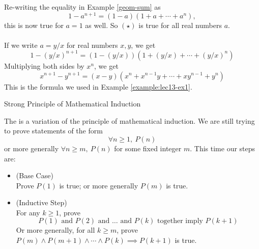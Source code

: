 \begin{remark}
Re-writing the equality in Example \ref{geom-sum} as
\[1 - a^{n+1} = (1-a)(1 + a + \cdots + a^n), \tag{$\star$}\]
this is now true for $a = 1$ as well. So $(\star)$ is true for all real numbers $a$.\\
\\
If we write $a = y/x$ for real numbers $x,y$, we get
\[1 - (y/x)^{n+1} = (1-(y/x))(1 + (y/x) + \cdots + (y/x)^n)\]
Multiplying both sides by $x^n$, we get
\[x^{n+1} - y^{n+1} = (x - y)(x^n + x^{n-1}y + \cdots + xy^{n-1} + y^n)\]
This is the formula we used in Example \ref{example:lec13-ex1}.
\end{remark}

\vspace*{2em}

\begin{mdframed}
\begin{center}
{\Large Strong Principle of Mathematical Induction}
\end{center}
\end{mdframed}

\begin{discussion}
The  is a variation of the principle of mathematical induction. We are still trying to prove statements of the form 
\[\forall n \geq 1,\ P(n)\]
or more generally {\color{indigo}$\forall n \geq m,\ P(n)$} for some fixed integer $m$.
This time our steps are:
\begin{itemize}[leftmargin=*]
\item[](Base Case)\\[0.5em] Prove $P(1)$ is true; or more generally {\color{indigo}$P(m)$ is true.}
\item[](Inductive Step)\\[0.5em] For any $k \geq 1$, prove \[\text{$P(1)$ and $P(2)$ and $\ldots$ and $P(k)$ together imply $P(k+1)$}\] 
Or more generally, {\color{indigo} for all $k \geq m$, prove $P(m) \land P(m+1) \land \cdots \land P(k) \implies P(k+1)$ is true}.
\end{itemize}
\end{discussion}

\vspace*{1em}

